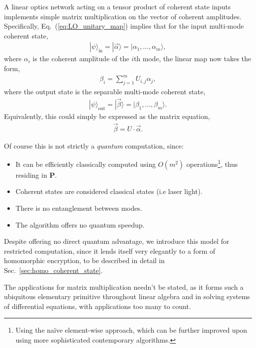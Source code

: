\documentclass[aps, rmp, twocolumn, amsmath, amssymb, nofootinbib, superscriptaddress, longbibliography, floatfix, table-of-contents, eqsecnum]{revtex4-1}
\newcommand{\ket}[1]{|#1\rangle}
\begin{document}
A linear optics network acting on a tensor product of coherent state inputs implements simple matrix multiplication on the vector of coherent amplitudes. Specifically, Eq.~(\ref{eq:LO_unitary_map}) implies that for the input multi-mode coherent state,
\begin{align}
\ket{\psi}_\text{in} = \ket{\vec\alpha} = \ket{\alpha_1,\dots,\alpha_m},
\end{align}
where $\alpha_i$ is the coherent amplitude of the $i$th mode, the linear map now takes the form,
\begin{align}
\beta_i = \sum_{j=1}^m U_{i,j} \alpha_j,
\end{align}
where the output state is the separable multi-mode coherent state,
\begin{align}
\ket{\psi}_\text{out} = \ket{\vec\beta} = \ket{\beta_1,\dots,\beta_m}.
\end{align}
Equivalently, this could simply be expressed as the matrix equation,
\begin{align}
\vec{\beta} = U\cdot\vec{\alpha}.
\end{align}

Of course this is not strictly a \textit{quantum} computation, since:
\begin{itemize}
\item It can be efficiently classically computed using $O(m^2)$ operations\footnote{Using the na\"ive element-wise approach, which can be further improved upon using more sophisticated contemporary algorithms.}, thus residing in \textbf{P}.
\item Coherent states are considered classical states (i.e laser light).
\item There is no entanglement between modes.
\item The algorithm offers no quantum speedup.
\end{itemize}

Despite offering no direct quantum advantage, we introduce this model for restricted computation, since it lends itself very elegantly to a form of homomorphic encryption, to be described in detail in Sec.~\ref{sec:homo_coherent_state}.

The applications for matrix multiplication needn't be stated, as it forms such a ubiquitous elementary primitive throughout linear algebra and in solving systems of differential equations, with applications too many to count.

%
%
\end{document}
